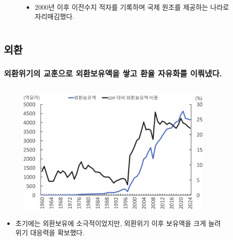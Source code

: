 \documentclass[aspectratio=169,xcolor=dvipsnames,handout]{beamer}
\begin{document}
\begin{frame}
\begin{columns}
\begin{column}{.5\textwidth}
\begin{figure}
            \\
            \begin{itemize}[<+->]
                \item 2000년 이후 이전수지 적자를 기록하며 국제 원조를 제공하는 나라로 자리매김했다.
            \end{itemize}
        \end{figure}
    \end{column}
\end{columns}
\end{frame}

\subsection{외환}
\begin{frame}
\frametitle{외환위기의 교훈으로 외환보유액을 쌓고 환율 자유화를 이뤄냈다.}
\begin{columns}
    \begin{column}{.5\textwidth}
        \begin{figure}
            \centering
            \includegraphics[width=.8\textwidth]{pic/fig_econ_08.png}
        \end{figure}
        \begin{itemize}[<+->]
            \item 초기에는 외환보유에 소극적이었지만, 외환위기 이후 보유액을 크게 늘려 위기 대응력을 확보했다.
        \end{itemize}
    \end{column}
    \begin{column}{.5\textwidth}
        \begin{figure}
            \centering

\end{figure}
\end{column}
\end{columns}
\end{frame}
\end{document}
